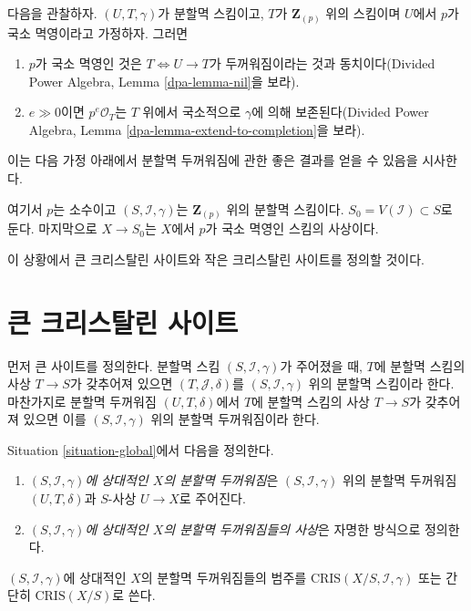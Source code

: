 \noindent
다음을 관찰하자. $(U, T, \gamma)$가 분할멱 스킴이고,
$T$가 $\mathbf{Z}_{(p)}$ 위의 스킴이며 $U$에서 $p$가 국소 멱영이라고
가정하자. 그러면
\begin{enumerate}
\item $p$가 국소 멱영인 것은 $T \Leftrightarrow U \to T$가
두꺼워짐이라는 것과 동치이다(Divided Power Algebra,
Lemma \ref{dpa-lemma-nil}을 보라).
\item $e \gg 0$이면 $p^e\mathcal{O}_T$는 $T$ 위에서 국소적으로
$\gamma$에 의해 보존된다(Divided Power Algebra,
Lemma \ref{dpa-lemma-extend-to-completion}을 보라).
\end{enumerate}
이는 다음 가정 아래에서 분할멱 두꺼워짐에 관한 좋은 결과를
얻을 수 있음을 시사한다.

\begin{situation}
\label{situation-global}
여기서 $p$는 소수이고 $(S, \mathcal{I}, \gamma)$는
$\mathbf{Z}_{(p)}$ 위의 분할멱 스킴이다.
$S_0 = V(\mathcal{I}) \subset S$로 둔다. 마지막으로
$X \to S_0$는 $X$에서 $p$가 국소 멱영인 스킴의 사상이다.
\end{situation}

\noindent
이 상황에서 큰 크리스탈린 사이트와 작은 크리스탈린 사이트를
정의할 것이다.









\section{큰 크리스탈린 사이트}
\label{section-big-site}

\noindent
먼저 큰 사이트를 정의한다. 분할멱 스킴
$(S, \mathcal{I}, \gamma)$가 주어졌을 때, $T$에 분할멱 스킴의
사상 $T \to S$가 갖추어져 있으면 $(T, \mathcal{J}, \delta)$를
$(S, \mathcal{I}, \gamma)$ 위의 분할멱 스킴이라 한다.
마찬가지로 분할멱 두꺼워짐 $(U, T, \delta)$에서 $T$에
분할멱 스킴의 사상 $T \to S$가 갖추어져 있으면 이를
$(S, \mathcal{I}, \gamma)$ 위의 분할멱 두꺼워짐이라 한다.

\begin{definition}
\label{definition-divided-power-thickening-X}
Situation \ref{situation-global}에서 다음을 정의한다.
\begin{enumerate}
\item {\it $(S, \mathcal{I}, \gamma)$에 상대적인 $X$의 분할멱 두꺼워짐}은
$(S, \mathcal{I}, \gamma)$ 위의 분할멱 두꺼워짐
$(U, T, \delta)$과 $S$-사상 $U \to X$로 주어진다.
\item {\it $(S, \mathcal{I}, \gamma)$에 상대적인 $X$의 분할멱
두꺼워짐들의 사상}은 자명한 방식으로 정의한다.
\end{enumerate}
$(S, \mathcal{I}, \gamma)$에 상대적인 $X$의 분할멱 두꺼워짐들의
범주를 $\text{CRIS}(X/S, \mathcal{I}, \gamma)$ 또는 간단히
$\text{CRIS}(X/S)$로 쓴다.
\end{definition}

